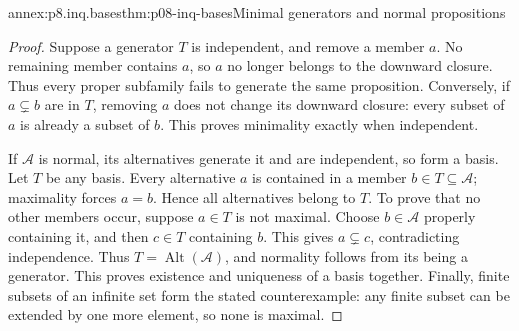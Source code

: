 \begin{annexitem}{annex:p8.inq.bases}{thm:p08-inq-bases}{Minimal generators and normal propositions}
\begin{proof}
Suppose a generator \(T\) is independent, and remove a member \(a\).
No remaining member contains \(a\), so \(a\) no longer belongs to the
downward closure. Thus every proper subfamily fails to generate the same
proposition. Conversely, if \(a\subsetneq b\) are in \(T\), removing \(a\)
does not change its downward closure: every subset of \(a\) is already a
subset of \(b\). This proves minimality exactly when independent.

If \(\mathcal A\) is normal, its alternatives generate it and are independent,
so form a basis. Let \(T\) be any basis. Every alternative \(a\) is contained
in a member \(b\in T\subseteq\mathcal A\); maximality forces \(a=b\).
Hence all alternatives belong to \(T\). To prove that no other members
occur, suppose \(a\in T\) is not maximal. Choose \(b\in\mathcal A\) properly
containing it, and then \(c\in T\) containing \(b\). This gives
\(a\subsetneq c\), contradicting independence. Thus
\(T=\operatorname{Alt}(\mathcal A)\), and normality follows from its being
a generator. This proves existence and uniqueness of a basis together.
Finally, finite subsets of an infinite set form the stated counterexample:
any finite subset can be extended by one more element, so none is maximal.
\end{proof}
\end{annexitem}


